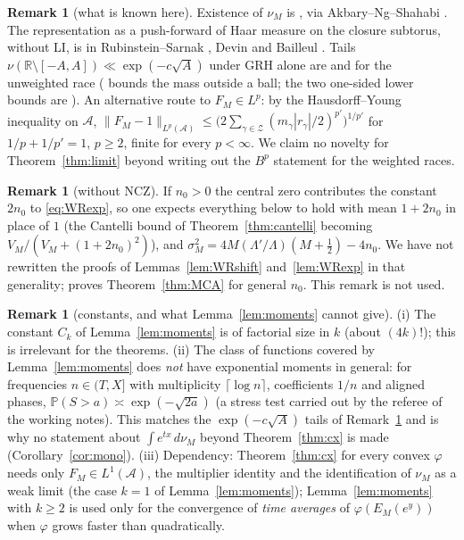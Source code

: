 \documentclass[11pt]{amsart}
\theoremstyle{definition}
\newtheorem{remark}[theorem]{Remark}
\numberwithin{equation}{section}
\newcommand{\PP}{\mathbb P}
\newcommand{\cA}{\mathcal A}          %
\newcommand{\cZ}{\mathcal Z}          %
\begin{document}
\begin{remark}[what is known here]\label{rem:known}
Existence of $\nu_M$ is \cite[Theorem~1(i)]{WR}, via
Akbary--Ng--Shahabi \cite{ANS14}. The representation as a
push-forward of Haar measure on the closure subtorus, without LI, is
in Rubinstein--Sarnak \cite[\S2]{RS94}, Devin \cite[\S4]{Dev20} and
Bailleul \cite[\S4]{Bai21}. Tails
$\nu(\mathbb R\setminus[-A,A])\ll\exp(-c\sqrt A)$ under GRH alone
are \cite[Theorem~1.2]{RS94} and \cite[Theorem~2.1]{Dev20} for the
unweighted race (\cite[Theorem~1.2]{RS94} bounds the mass outside a
ball; the two one-sided lower bounds are
\cite[Theorem~2.5(1)]{Dev20}). An alternative route to
$F_M\in L^p$: by the Hausdorff--Young inequality on $\cA$,
$\|F_M-1\|_{L^p(\cA)}\le\bigl(2\sum_{\gamma\in\cZ}
(m_\gamma|r_\gamma|/2)^{p'}\bigr)^{1/p'}$ for $1/p+1/p'=1$,
$p\ge2$, finite for every $p<\infty$. We claim no novelty for
Theorem~\ref{thm:limit} beyond writing out the $B^p$ statement for
the weighted races.
\end{remark}

\begin{remark}[without NCZ]\label{rem:noNCZ}
If $n_0>0$ the central zero contributes the constant $2n_0$ to
\eqref{eq:WRexp}, so one expects everything below to hold with mean
$1+2n_0$ in place of $1$ (the Cantelli bound of
Theorem~\ref{thm:cantelli} becoming $V_M/(V_M+(1+2n_0)^2)$), and
$\sigma_M^2=4M(\Lambda'/\Lambda)(M+\tfrac12)-4n_0$. We have not
rewritten the proofs of Lemmas~\ref{lem:WRshift}
and~\ref{lem:WRexp} in that generality; \cite{MC} proves
Theorem~\ref{thm:MCA} for general $n_0$. This remark is not used.
\end{remark}

\begin{remark}[constants, and what Lemma~\ref{lem:moments} cannot
give]\label{rem:noexp}
(i) The constant $C_k$ of Lemma~\ref{lem:moments} is of factorial
size in $k$ (about $(4k)!$); this is irrelevant for the theorems.
(ii) The class of functions covered by Lemma~\ref{lem:moments} does
\emph{not} have exponential moments in general: for frequencies
$n\in(T,X]$ with multiplicity $\lceil\log n\rceil$, coefficients
$1/n$ and aligned phases, $\PP(S>a)\asymp\exp(-\sqrt{2a})$ (a stress
test carried out by the referee of the working notes). This matches
the $\exp(-c\sqrt A)$ tails of Remark~\ref{rem:known} and is why no
statement about $\int e^{tx}\,d\nu_M$ beyond Theorem~\ref{thm:cx} is
made (Corollary~\ref{cor:mono}).
(iii) Dependency: Theorem~\ref{thm:cx} for every convex $\varphi$
needs only $F_M\in L^1(\cA)$, the multiplier identity and the
identification of $\nu_M$ as a weak limit (the case $k=1$ of
Lemma~\ref{lem:moments}); Lemma~\ref{lem:moments} with $k\ge2$ is
used only for the convergence of \emph{time averages} of
$\varphi(E_M(e^y))$ when $\varphi$ grows faster than quadratically.
\end{remark}
\end{document}

